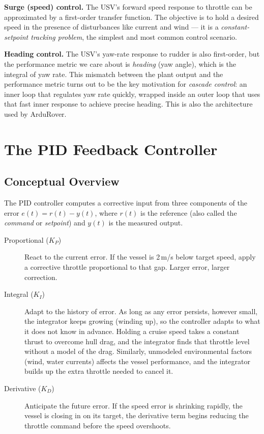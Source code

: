 \documentclass[12pt]{article}
\begin{document}
\textbf{Surge (speed) control.}
The USV's forward speed response to throttle can be approximated by a
first-order transfer function.  The objective is to hold a desired speed in the presence of disturbances like current and wind --- it is a
\emph{constant-setpoint tracking problem}, the simplest and most common control
scenario.

\textbf{Heading control.}
The USV's yaw-rate response to rudder is also first-order, but the performance
metric we care about is \emph{heading} (yaw angle), which is the integral of
yaw rate.  This mismatch between the plant output and the performance metric
turns out to be the key motivation for \emph{cascade control}: an inner loop
that regulates yaw rate quickly, wrapped inside an outer loop that uses that
fast inner response to achieve precise heading.  This is also the architecture
used by ArduRover.


\section{The PID Feedback Controller}
\label{sec:pid}

\subsection{Conceptual Overview}

The PID controller computes a corrective input from three components of the
error $e(t) = r(t) - y(t)$, where $r(t)$ is the reference (also called
the \emph{command} or \emph{setpoint}) and $y(t)$ is the measured output.

\begin{description}
  \item[Proportional ($K_P$)] React to the current error.  If the vessel is
    2\,m/s below target speed, apply a corrective throttle proportional to
    that gap.  Larger error, larger correction.
  \item[Integral ($K_I$)] Adapt to the history of error.  As long as any error persists, however small, the integrator keeps growing (winding up), so the controller adapts to what it does not know in advance.  Holding a cruise speed takes a constant thrust to overcome hull drag, and the integrator finds that throttle level without a model of the drag.  Similarly, unmodeled environmental factors (wind, water currents) affects the vessel performance, and the integrator builds up the extra throttle needed to cancel it.
  \item[Derivative ($K_D$)] Anticipate the future error.  If the speed error is
    shrinking rapidly, the vessel is closing in on its target, the
    derivative term begins reducing the throttle command before the speed
    overshoots.
\end{description}
\end{document}
